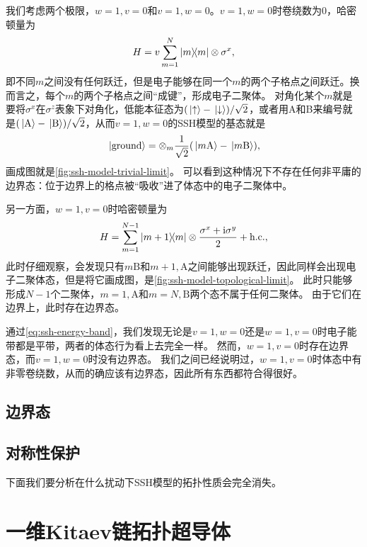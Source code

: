我们考虑两个极限，$w = 1, v = 0$和$v = 1, w = 0$。$v = 1, w = 0$时卷绕数为0，哈密顿量为
\begin{equation}
    H = v \sum_{m=1}^N \dyad{m} \otimes \sigma^x ,
\end{equation}
即不同$m$之间没有任何跃迁，但是电子能够在同一个$m$的两个子格点之间跃迁。换而言之，每个$m$的两个子格点之间“成键”，形成电子二聚体。
对角化某个$m$就是要将$\sigma^x$在$\sigma^z$表象下对角化，低能本征态为$(\ket*{\uparrow} - \ket*{\downarrow}) / \sqrt{2}$，或者用A和B来编号就是$(\ket*{\text{A}} - \ket*{\text{B}}) / \sqrt{2}$，从而$v = 1, w = 0$的SSH模型的基态就是
\begin{equation}
    \ket*{\text{ground}} = \otimes_{m} \frac{1}{\sqrt{2}} (\ket*{m \text{A}} - \ket*{m \text{B}}),
\end{equation}
画成图就是\autoref{fig:ssh-model-trivial-limit}。
可以看到这种情况下不存在任何非平庸的边界态：位于边界上的格点被“吸收”进了体态中的电子二聚体中。

另一方面，$w = 1, v = 0$时哈密顿量为
\begin{equation}
    H = \sum_{m=1}^{N-1} \dyad{m+1}{m} \otimes \frac{\sigma^x + \ii \sigma^y}{2} + \text{h.c.},
\end{equation}
此时仔细观察，会发现只有$m \text{B}$和$m+1, \text{A}$之间能够出现跃迁，因此同样会出现电子二聚体态，但是将它画成图，是\autoref{fig:ssh-model-topological-limit}。
此时只能够形成$N-1$个二聚体，$m=1, \text{A}$和$m=N, \text{B}$两个态不属于任何二聚体。
由于它们在边界上，此时存在边界态。

通过\eqref{eq:ssh-energy-band}，我们发现无论是$v=1, w=0$还是$w=1,v=0$时电子能带都是平带，两者的体态行为看上去完全一样。
然而，$w=1, v=0$时存在边界态，而$v=1, w=0$时没有边界态。
我们之间已经说明过，$w=1, v=0$时体态中有非零卷绕数，从而的确应该有边界态，因此所有东西都符合得很好。

\subsection{边界态}

\subsection{对称性保护}

下面我们要分析在什么扰动下SSH模型的拓扑性质会完全消失。

\section{一维Kitaev链拓扑超导体}

